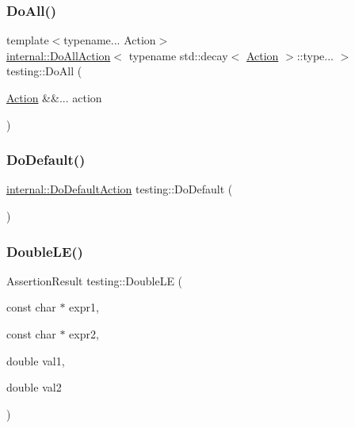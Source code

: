 \subsubsection{\texorpdfstring{DoAll()}{DoAll()}\hspace{0.1cm}{\footnotesize\ttfamily [10/10]}}
{\footnotesize\ttfamily template$<$typename... Action$>$ \\
\mbox{\hyperlink{structtesting_1_1internal_1_1_do_all_action}{internal\+::\+Do\+All\+Action}}$<$ typename std\+::decay$<$ \mbox{\hyperlink{classtesting_1_1_action}{Action}} $>$\+::type... $>$ testing\+::\+Do\+All (\begin{DoxyParamCaption}\item[{\mbox{\hyperlink{classtesting_1_1_action}{Action}} \&\&...}]{action }\end{DoxyParamCaption})}

\mbox{\label{namespacetesting_ae041df61ff61ccb9753ba15b4309e1a6}} 
\subsubsection{\texorpdfstring{DoDefault()}{DoDefault()}}
{\footnotesize\ttfamily \mbox{\hyperlink{classtesting_1_1internal_1_1_do_default_action}{internal\+::\+Do\+Default\+Action}} testing\+::\+Do\+Default (\begin{DoxyParamCaption}{ }\end{DoxyParamCaption})\hspace{0.3cm}{\ttfamily [inline]}}

\mbox{\label{namespacetesting_ae10e2bb304b74abd1b06a2d912a8b43b}} 
\subsubsection{\texorpdfstring{DoubleLE()}{DoubleLE()}}
{\footnotesize\ttfamily Assertion\+Result testing\+::\+Double\+LE (\begin{DoxyParamCaption}\item[{const char $\ast$}]{expr1,  }\item[{const char $\ast$}]{expr2,  }\item[{double}]{val1,  }\item[{double}]{val2 }\end{DoxyParamCaption})}

